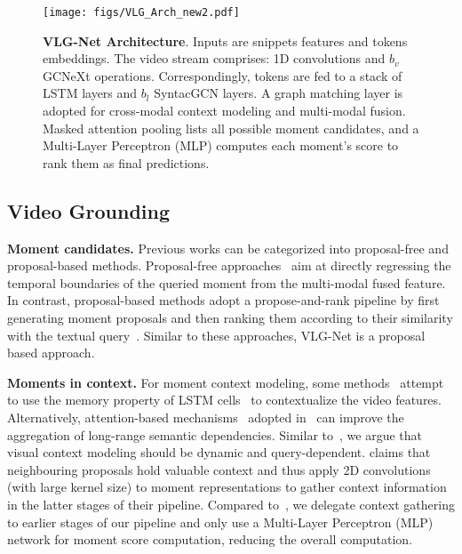 \documentclass[10pt,twocolumn,letterpaper]{article}
\begin{document}
\begin{figure*}[t!]
    \centering
        \texttt{[image: figs/VLG\_Arch\_new2.pdf]} \caption{\textbf{VLG-Net Architecture}. 
    Inputs are snippets features and tokens embeddings. The video stream comprises: 1D convolutions and $b_v$ GCNeXt operations. Correspondingly, tokens are fed to a stack of LSTM layers and $b_l$ SyntacGCN layers. A graph matching layer is adopted for cross-modal context modeling and multi-modal fusion. Masked attention pooling lists all possible moment candidates, and a Multi-Layer Perceptron (MLP) computes each moment's score to rank them as final predictions.}
    \label{fig:arch}
    \vspace{-0.3cm}
\end{figure*}

\subsection{Video Grounding}
\noindent \textbf{Moment candidates.} Previous works can be categorized into  proposal-free and proposal-based methods. Proposal-free approaches~\cite{chenhierarchical, Liu_2018_ECCV, Mun_2020_CVPR, Rodriguez_2020_WACV, chen2020learning, ABLR, Zeng_2020_CVPR} aim at directly regressing the temporal boundaries of the queried moment from the multi-modal fused feature. In contrast, proposal-based methods adopt a propose-and-rank pipeline by first generating moment proposals and then ranking them according to their similarity with the  textual query~\cite{Hendricks_2017_ICCV, chen_etal_2018_temporally, QSPN,10.1145/3240508.3240549, wang2020temporally,  2DTAN_2020_AAAI}. Similar to these approaches, VLG-Net is a proposal based approach.

\noindent \textbf{Moments in context.} 
For moment context modeling, some methods~\cite{ chen_etal_2018_temporally, ghosh_etal_2019_excl} attempt to use the memory property of LSTM cells~\cite{HochSchm97} to contextualize the video features. 
Alternatively, attention-based mechanisms~\cite{NIPS2017_7181} adopted in~\cite{lin2020moment,ACRN_SIGIR_18, wang2020temporally} can improve the aggregation of long-range semantic dependencies. Similar to~\cite{wang2020temporally}, we argue that visual context modeling should be dynamic and query-dependent. \cite{ 2DTAN_2020_AAAI} claims that neighbouring proposals hold valuable context and thus apply 2D convolutions (with large kernel size) to moment representations to gather context information in the latter stages of their pipeline. 
Compared to~\cite{2DTAN_2020_AAAI}, we delegate context gathering to earlier stages of our pipeline and only use a Multi-Layer Perceptron (MLP) network for moment score computation, reducing the overall computation.
\end{document}
